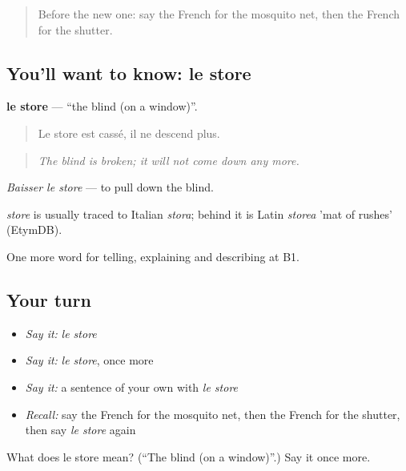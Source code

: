 \label{lesson:FR-C430-store}



\begin{quote}
Before the new one: say the French for the mosquito net, then the French for the shutter.
\end{quote}

\subsection*{You'll want to know: le store}
\textbf{le store} — \textquotedblleft{}the blind (on a window)\textquotedblright{}.

\begin{quote}
Le store est cassé, il ne descend plus.
\end{quote}

\begin{quote}
\emph{The blind is broken; it will not come down any more.}
\end{quote}

\emph{Baisser le store} — to pull down the blind.

\begin{cousinweb}
\emph{store} is usually traced to Italian \emph{stora}; behind it is Latin \emph{storea} 'mat of rushes' (EtymDB).
\end{cousinweb}

\begin{grammarlens}[title={What you've built}]
One more word for telling, explaining and describing at B1.
\end{grammarlens}

\subsection*{Your turn}
\begin{itemize}
\raggedright
  \item \emph{Say it:} \emph{le store}
  \item \emph{Say it:} \emph{le store}, once more
  \item \emph{Say it:} a sentence of your own with \emph{le store}
  \item \emph{Recall:} say the French for the mosquito net, then the French for the shutter, then say \emph{le store} again
\end{itemize}

\begin{tcolorbox}[breakable,colback=teal!4,colframe=teal!35!black,title={Before you move on}]
What does le store mean? (\textquotedblleft{}The blind (on a window)\textquotedblright{}.) Say it once more.
\end{tcolorbox}
